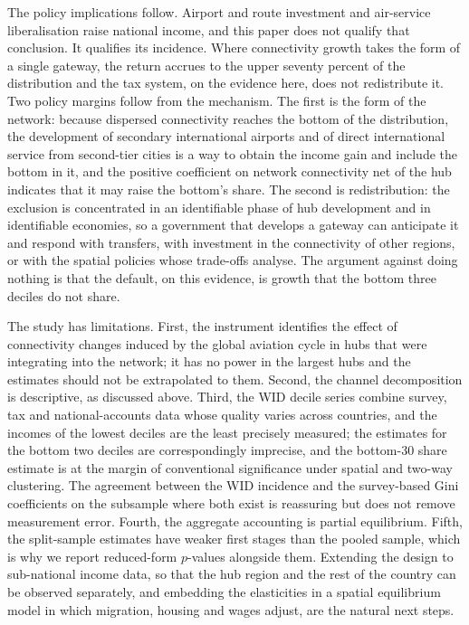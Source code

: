 The policy implications follow. Airport and route investment and air-service liberalisation raise national income, and this paper does not qualify that conclusion. It qualifies its incidence. Where connectivity growth takes the form of a single gateway, the return accrues to the upper seventy percent of the distribution and the tax system, on the evidence here, does not redistribute it. Two policy margins follow from the mechanism. The first is the form of the network: because dispersed connectivity reaches the bottom of the distribution, the development of secondary international airports and of direct international service from second-tier cities is a way to obtain the income gain and include the bottom in it, and the positive coefficient on network connectivity net of the hub indicates that it may raise the bottom's share. The second is redistribution: the exclusion is concentrated in an identifiable phase of hub development and in identifiable economies, so a government that develops a gateway can anticipate it and respond with transfers, with investment in the connectivity of other regions, or with the spatial policies whose trade-offs \citet{Fajgelbaum_2020} analyse. The argument against doing nothing is that the default, on this evidence, is growth that the bottom three deciles do not share.

The study has limitations. First, the instrument identifies the effect of connectivity changes induced by the global aviation cycle in hubs that were integrating into the network; it has no power in the largest hubs and the estimates should not be extrapolated to them. Second, the channel decomposition is descriptive, as discussed above. Third, the WID decile series combine survey, tax and national-accounts data whose quality varies across countries, and the incomes of the lowest deciles are the least precisely measured; the estimates for the bottom two deciles are correspondingly imprecise, and the bottom-30 share estimate is at the margin of conventional significance under spatial and two-way clustering. The agreement between the WID incidence and the survey-based Gini coefficients on the subsample where both exist is reassuring but does not remove measurement error. Fourth, the aggregate accounting is partial equilibrium. Fifth, the split-sample estimates have weaker first stages than the pooled sample, which is why we report reduced-form $p$-values alongside them. Extending the design to sub-national income data, so that the hub region and the rest of the country can be observed separately, and embedding the elasticities in a spatial equilibrium model in which migration, housing and wages adjust, are the natural next steps.

